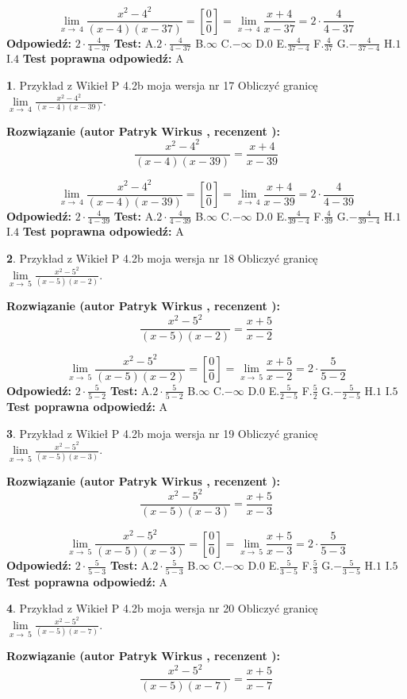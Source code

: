 \documentclass[12pt, a4paper]{article}
\theoremstyle{definition} %
\newtheorem{zad}{}
\newcommand{\zadStart}[1]{\begin{zad}#1\newline}
\newcommand{\zadStop}{\end{zad}}
\newcommand{\rozwStart}[2]{\noindent \textbf{Rozwiązanie (autor #1 , recenzent #2): }\newline}
\newcommand{\rozwStop}{\newline}
\newcommand{\odpStart}{\noindent \textbf{Odpowiedź:}\newline}
\newcommand{\odpStop}{\newline}
\newcommand{\testStart}{\noindent \textbf{Test:}\newline}
\newcommand{\testStop}{\newline}
\newcommand{\kluczStart}{\noindent \textbf{Test poprawna odpowiedź:}\newline}
\newcommand{\kluczStop}{\newline}
\begin{document}
$$\lim\limits_{x\to\ 4}\frac{x^{2}-4^{2}}{(x-4)(x-37)}=[\frac{0}{0}]=\lim\limits_{x\to\ 4}\frac{x+4}{x-37}=2 \cdot \frac{4}{4-37}$$
\rozwStop
\odpStart
$2 \cdot \frac{4}{4-37}$
\odpStop
\testStart
A.$2 \cdot \frac{4}{4-37}$
B.$\infty$
C.$-\infty$
D.$0$
E.$\frac{4}{37-4}$
F.$\frac{4}{37}$
G.$-\frac{4}{37-4}$
H.$1$
I.$4$
\testStop
\kluczStart
A
\kluczStop



\zadStart{Przykład z Wikieł P 4.2b moja wersja nr 17}
Obliczyć granicę $\lim\limits_{x\to\ 4}\frac{x^{2}-4^{2}}{(x-4)(x-39)}$.
\zadStop
\rozwStart{Patryk Wirkus}{}
$$\frac{x^{2}-4^{2}}{(x-4)(x-39)}=\frac{x+4}{x-39}$$

$$\lim\limits_{x\to\ 4}\frac{x^{2}-4^{2}}{(x-4)(x-39)}=[\frac{0}{0}]=\lim\limits_{x\to\ 4}\frac{x+4}{x-39}=2 \cdot \frac{4}{4-39}$$
\rozwStop
\odpStart
$2 \cdot \frac{4}{4-39}$
\odpStop
\testStart
A.$2 \cdot \frac{4}{4-39}$
B.$\infty$
C.$-\infty$
D.$0$
E.$\frac{4}{39-4}$
F.$\frac{4}{39}$
G.$-\frac{4}{39-4}$
H.$1$
I.$4$
\testStop
\kluczStart
A
\kluczStop



\zadStart{Przykład z Wikieł P 4.2b moja wersja nr 18}
Obliczyć granicę $\lim\limits_{x\to\ 5}\frac{x^{2}-5^{2}}{(x-5)(x-2)}$.
\zadStop
\rozwStart{Patryk Wirkus}{}
$$\frac{x^{2}-5^{2}}{(x-5)(x-2)}=\frac{x+5}{x-2}$$

$$\lim\limits_{x\to\ 5}\frac{x^{2}-5^{2}}{(x-5)(x-2)}=[\frac{0}{0}]=\lim\limits_{x\to\ 5}\frac{x+5}{x-2}=2 \cdot \frac{5}{5-2}$$
\rozwStop
\odpStart
$2 \cdot \frac{5}{5-2}$
\odpStop
\testStart
A.$2 \cdot \frac{5}{5-2}$
B.$\infty$
C.$-\infty$
D.$0$
E.$\frac{5}{2-5}$
F.$\frac{5}{2}$
G.$-\frac{5}{2-5}$
H.$1$
I.$5$
\testStop
\kluczStart
A
\kluczStop



\zadStart{Przykład z Wikieł P 4.2b moja wersja nr 19}
Obliczyć granicę $\lim\limits_{x\to\ 5}\frac{x^{2}-5^{2}}{(x-5)(x-3)}$.
\zadStop
\rozwStart{Patryk Wirkus}{}
$$\frac{x^{2}-5^{2}}{(x-5)(x-3)}=\frac{x+5}{x-3}$$

$$\lim\limits_{x\to\ 5}\frac{x^{2}-5^{2}}{(x-5)(x-3)}=[\frac{0}{0}]=\lim\limits_{x\to\ 5}\frac{x+5}{x-3}=2 \cdot \frac{5}{5-3}$$
\rozwStop
\odpStart
$2 \cdot \frac{5}{5-3}$
\odpStop
\testStart
A.$2 \cdot \frac{5}{5-3}$
B.$\infty$
C.$-\infty$
D.$0$
E.$\frac{5}{3-5}$
F.$\frac{5}{3}$
G.$-\frac{5}{3-5}$
H.$1$
I.$5$
\testStop
\kluczStart
A
\kluczStop



\zadStart{Przykład z Wikieł P 4.2b moja wersja nr 20}
Obliczyć granicę $\lim\limits_{x\to\ 5}\frac{x^{2}-5^{2}}{(x-5)(x-7)}$.
\zadStop
\rozwStart{Patryk Wirkus}{}
$$\frac{x^{2}-5^{2}}{(x-5)(x-7)}=\frac{x+5}{x-7}$$
\end{document}
